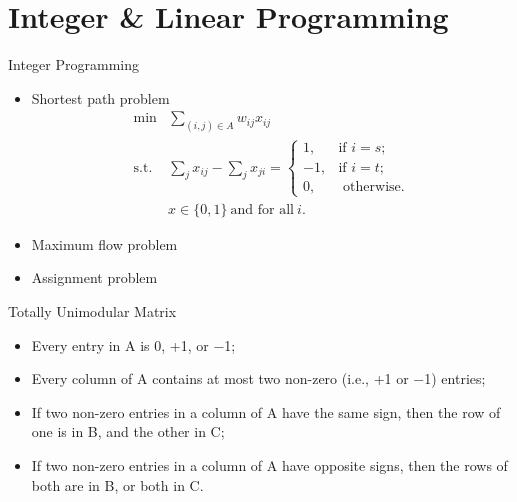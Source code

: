 \section{Integer \& Linear Programming}

    \frame{\sectionpage}

    \begin{frame}{Integer Programming}
        \begin{itemize}
          \item Shortest path problem
          \begin{equation*}
            \begin{align}
            \min& \sum_{(i,j)\in A}w_{ij}x_{ij}\\
            \text{s.t.} &\sum_{j}x_{ij}-\sum_{j}x_{ji}={\begin{cases}1,&{\text{if }}i=s;\\-1,&{\text{if }}i=t;\\0,&{\text{ otherwise.}}\end{cases}}\\
            & x\in \{0,1\} ~\text{and for all} ~i.
            \end{align}
          \end{equation*}
          \item<+-> Maximum flow problem
          \item<+-> Assignment problem
        \end{itemize}
    \end{frame}

    \begin{frame}{Totally Unimodular Matrix}
      \begin{itemize}
        \item Every entry in A is 0, +1, or −1;
        \item Every column of A contains at most two non-zero (i.e., +1 or −1) entries;
        \item If two non-zero entries in a column of A have the same sign, then the row of one is in B, and the other in C;
        \item If two non-zero entries in a column of A have opposite signs, then the rows of both are in B, or both in C.
      \end{itemize}
    \end{frame}

